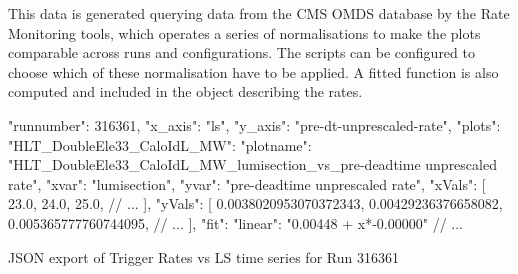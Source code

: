 This data is generated querying data from the CMS OMDS database by the Rate Monitoring tools, which operates a series of normalisations to make the plots comparable across runs and configurations. The scripts can be configured to choose which of these normalisation have to be applied. A fitted function is also computed and included in the object describing the rates.

\begin{listing}[H]
\begin{jsoncode}
{
    "runnumber": 316361,
    "x_axis": "ls",
    "y_axis": "pre-dt-unprescaled-rate",
    "plots": {
        "HLT_DoubleEle33_CaloIdL_MW": {
            "plotname": "HLT_DoubleEle33_CaloIdL_MW_lumisection_vs_pre-deadtime unprescaled rate",
            "xvar": "lumisection",
            "yvar": "pre-deadtime unprescaled rate",
            "xVals": [
                23.0,
                24.0,
                25.0,
                // ...
            ],
            "yVals": [
                0.0038020953070372343,
                0.00429236376658082,
                0.005365777760744095,
                // ...
            ],
            "fit": {
                "linear": "0.00448 + x*-0.00000"
            }
        }
        // ...
    }
}

\end{jsoncode}
\caption{JSON export of Trigger Rates vs LS time series for Run 316361}
\end{listing}